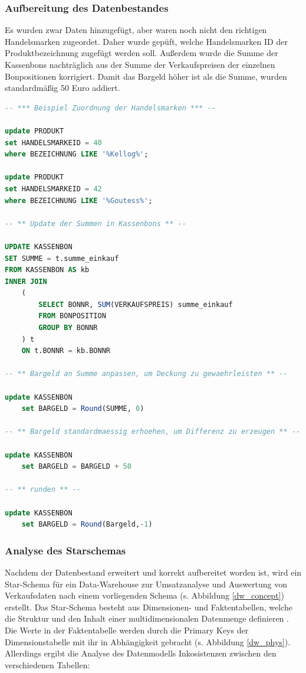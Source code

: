 \subsubsection{Aufbereitung des Datenbestandes}

Es wurden zwar Daten hinzugefügt, aber waren noch nicht den richtigen Handelsmarken zugeordet. Daher wurde gepüft, welche Handelsmarken ID der Produktbezeichnung zugefügt werden soll.
Außerdem wurde die Summe der Kassenbons nachträglich aus der Summe der Verkaufspreisen der einzelnen Bonpositionen korrigiert. Damit das Bargeld höher ist als die Summe, wurden standardmäßig 50 Euro addiert.

\begin{lstlisting}[language=SQL]
  -- *** Beispiel Zuordnung der Handelsmarken *** --

update PRODUKT
set HANDELSMARKEID = 40
where BEZEICHNUNG LIKE '%Kellog%';

update PRODUKT
set HANDELSMARKEID = 42
where BEZEICHNUNG LIKE '%Goutess%';

-- ** Update der Summen in Kassenbons ** --

UPDATE KASSENBON
SET SUMME = t.summe_einkauf
FROM KASSENBON AS kb
INNER JOIN
    (
        SELECT BONNR, SUM(VERKAUFSPREIS) summe_einkauf
        FROM BONPOSITION
        GROUP BY BONNR
    ) t
    ON t.BONNR = kb.BONNR

-- ** Bargeld an Summe anpassen, um Deckung zu gewaehrleisten ** --

update KASSENBON
	set BARGELD = Round(SUMME, 0)

-- ** Bargeld standardmaessig erhoehen, um Differenz zu erzeugen ** --

update KASSENBON
	set BARGELD = BARGELD + 50

-- ** runden ** --

update KASSENBON
	set BARGELD = Round(Bargeld,-1)


\end{lstlisting}

\subsubsection{Analyse des Starschemas}

Nachdem der Datenbestand erweitert und korrekt aufbereitet worden ist, wird ein Star-Schema für ein Data-Warehouse zur Umsatzanalyse und Auswertung von Verkaufsdaten nach einem vorliegenden Schema (s. Abbildung \ref{dw_concept}) erstellt. Das Star-Schema besteht aus Dimensionen- und Faktentabellen, welche die Struktur und den Inhalt einer multidimensionalen Datenmenge definieren \citep{Wulff2019}. Die Werte in der Faktentabelle werden durch die Primary Keys der Dimensionstabelle mit ihr in Abhängigkeit gebracht (s. Abbildung \ref{dw_phys}). Allerdings ergibt die Analyse des Datenmodells Inkosistenzen zwischen den verschiedenen Tabellen:

